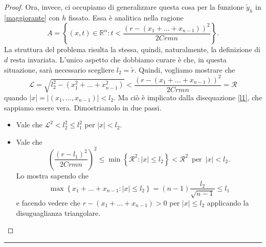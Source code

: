 \begin{proof}
Ora, invece, ci occupiamo di generalizzare questa cosa per la funzione $\widetilde{y}_h$ in \ref{maggiorante} con $h$ fissato. Essa è analitica nella ragione 
$$A = \left\{ (x,t) \in \mathbb{R}^n : t<\frac{(r-(x_1+\ldots +x_{n-1}))^2}{2Crmn} \right\} .$$
La struttura del problema risulta la stessa, quindi, naturalmente, la definizione di $d$ resta invariata. L'unico aspetto che dobbiamo curare è che, in questa situazione, sarà necessario scegliere $l_2 =\widetilde{r}$. 
Quindi, vogliamo mostrare che $$\mathcal{L}=\sqrt{l_2^2-(x_1^2+\ldots +x_{n-1}^2)} < \frac{(r-(x_1+\ldots +x_{n-1}))^2}{2Crmn}=\mathcal{R}$$
quando $|x|=|(x_1,\ldots ,x_{n-1})|< l_2$. Ma ciò è implicato dalla disequazione \ref{l1}, che sappiamo essere vera. Dimostriamolo in due passi.
\begin{itemize}
\item Vale che $\mathcal{L}^2< l_2^2 \leq l_1^2$ per $|x|< l_2$.
\item Vale che $$\left(\frac{(r-l_1)^2}{2Crmn}\right)^2 \leq \min \left\{ \mathcal{R}^2 : |x|\leq l_2 \right\}< \mathcal{R}^2 \, \text{ per } \, |x|< l_2.$$
Lo mostra sapendo che $$\max \left\{ x_1+\ldots +x_{n-1} : |x|\leq l_2\right\}= (n-1)\frac{l_2}{\sqrt{n-1}}\leq l_1$$ e facendo vedere che $r-(x_1+\ldots +x_{n-1})>0$ per $|x|\leq l_2$ applicando la disuguaglianza triangolare.
\qedhere
\end{itemize}
\end{proof}

\noindent\rule[0.5ex]{\linewidth}{0.2pt}

